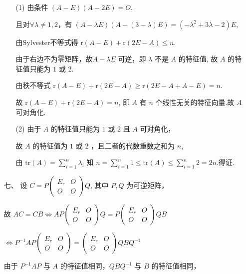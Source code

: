 \begin{enumerate}
    \begin{enumerate}
        \item[(1)] 由条件 \(\left(A-E\right)\left(A-2E\right)=O\),\par
        且对\(\forall \lambda \neq 1,2\)，有 \(\left(A-\lambda E\right)\left(A-\left(3-\lambda\right)E\right)=\left(-\lambda^2+3\lambda-2\right)E\),\par
        由Sylvester不等式得 \(\mathrm{r}(A-E)+\mathrm{r}(2E-A) \leq n\). \par
        由于右边不为零矩阵，故\(A-\lambda E\) 可逆，即 \(\lambda\) 不是 \(A\) 的特征值,
        故 \(A\) 的特征值只能为 \(1\) 或 \(2\).\par
        由秩不等式 \(\mathrm{r}(A-E)+\mathrm{r}(2E-A)\geq \mathrm{r}(2E-A + A-E)=n\). \par
        故 \(\mathrm{r}(A-E)+\mathrm{r}(2E-A)=n\), 即 \(A\) 有 \(n\) 个线性无关的特征向量.故 \(A\) 可对角化.
        \item[(2)] 由于 \(A\) 的特征值只能为 \(1\) 或 \(2\) 且 \(A\) 可对角化，\par
        故 \(A\) 的特征值为 \(1\) 或 \(2\) ，且二者的代数重数之和为 \(n\),\par
        由 \(\mathrm{tr}(A)=\sum\limits_{i=1}^n \lambda_i\) 知 \(n=\sum\limits_{i=1}^n 1 \leq \mathrm{tr}(A) \leq \sum\limits_{i=1}^n 2=2n\).得证.
    \end{enumerate}
    \item[七、]
    设 \(C=P\begin{pmatrix}
        E_r & O\\
        O & O
        \end{pmatrix}Q\), 其中 \(P,Q\) 为可逆矩阵，\par
    故 \(AC=CB \Leftrightarrow AP\begin{pmatrix}E_r & O\\O & O\end{pmatrix}Q=P\begin{pmatrix}E_r & O\\O & O\end{pmatrix}QB\)\par
    \(\Leftrightarrow P^{-1}AP\begin{pmatrix}E_r & O\\O & O\end{pmatrix}=\begin{pmatrix}E_r & O\\O & O\end{pmatrix}QBQ^{-1}\) \par
    由于 \(P^{-1}AP\) 与 \(A\) 的特征值相同，\(QBQ^{-1}\) 与 \(B\) 的特征值相同，\par

\end{enumerate}
